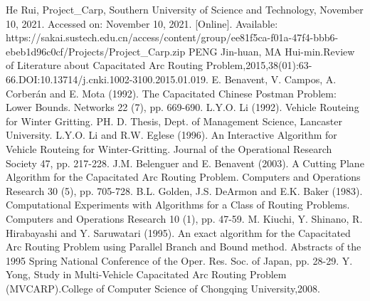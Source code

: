 \documentclass[conference,compsoc]{IEEEtran}
\begin{document}

%
%
\begin{thebibliography}{1}
 He Rui, Project\_Carp, Southern University of Science and Technology, November 10, 2021. Accessed on: November 10, 2021. [Online]. Available: https://sakai.sustech.edu.cn/access/content/group/ee81f5ca-f01a-47f4-bbb6-ebeb1d96c0cf/Projects/Project\_Carp.zip
 PENG Jin-huan, MA Hui-min.Review of Literature about Capacitated Arc Routing Problem,2015,38(01):63-66.DOI:10.13714/j.cnki.1002-3100.2015.01.019.
E. Benavent, V. Campos, A. Corberán and E. Mota (1992). The Capacitated Chinese Postman Problem: Lower Bounds. Networks 22 (7), pp. 669-690.
L.Y.O. Li (1992). Vehicle Routeing for Winter Gritting. PH. D. Thesis, Dept. of Management Science, Lancaster University.
L.Y.O. Li and R.W. Eglese (1996). An Interactive Algorithm for Vehicle Routeing for Winter-Gritting. Journal of the Operational Research Society 47, pp. 217-228.
J.M. Belenguer and E. Benavent (2003). A Cutting Plane Algorithm for the Capacitated Arc Routing Problem. Computers and Operations Research 30 (5), pp. 705-728.
B.L. Golden, J.S. DeArmon and E.K. Baker (1983). Computational Experiments with Algorithms for a Class of Routing Problems. Computers and Operations Research 10 (1), pp. 47-59.
M. Kiuchi, Y. Shinano, R. Hirabayashi and Y. Saruwatari (1995). An exact algorithm for the Capacitated Arc Routing Problem using Parallel Branch and Bound method. Abstracts of the 1995 Spring National Conference of the Oper. Res. Soc. of Japan, pp. 28-29.
Y. Yong, Study in Multi-Vehicle Capacitated Arc Routing Problem (MVCARP).College of Computer Science of Chongqing University,2008.

\end{thebibliography}
\newpage
\text{ }
\newpage
\end{document}
